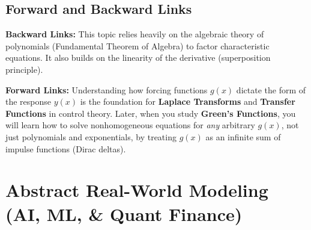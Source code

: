 \documentclass[11pt, a4paper]{article}
\theoremstyle{definition}
\theoremstyle{remark}
\begin{document}
\subsection{Forward and Backward Links}
\textbf{Backward Links:} This topic relies heavily on the algebraic theory of polynomials (Fundamental Theorem of Algebra) to factor characteristic equations. It also builds on the linearity of the derivative (superposition principle).

\textbf{Forward Links:} Understanding how forcing functions $g(x)$ dictate the form of the response $y(x)$ is the foundation for \textbf{Laplace Transforms} and \textbf{Transfer Functions} in control theory. Later, when you study \textbf{Green's Functions}, you will learn how to solve nonhomogeneous equations for \textit{any} arbitrary $g(x)$, not just polynomials and exponentials, by treating $g(x)$ as an infinite sum of impulse functions (Dirac deltas).

\begin{center}
\end{center}

\newpage
\section{Abstract Real-World Modeling (AI, ML, \& Quant Finance)}
\end{document}

